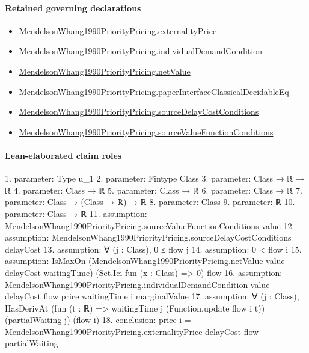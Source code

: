 \documentclass[10pt]{article}
\begin{document}
\paragraph{Retained governing declarations}
\begin{itemize}\raggedright
\item \hyperlink{governing-declaration-806f5a55d6021334}{Mendelson\allowbreak{}Whang1990\allowbreak{}Priority\allowbreak{}Pricing.\allowbreak{}externality\allowbreak{}Price}
\item \hyperlink{paper-prerequisite-6c93de2469b53cb2}{Mendelson\allowbreak{}Whang1990\allowbreak{}Priority\allowbreak{}Pricing.\allowbreak{}individual\allowbreak{}Demand\allowbreak{}Condition}
\item \hyperlink{paper-prerequisite-7dbaca4145f3a4a5}{Mendelson\allowbreak{}Whang1990\allowbreak{}Priority\allowbreak{}Pricing.\allowbreak{}net\allowbreak{}Value}
\item \hyperlink{governing-declaration-3df5d95507228c45}{Mendelson\allowbreak{}Whang1990\allowbreak{}Priority\allowbreak{}Pricing.\allowbreak{}paper\allowbreak{}Interface\allowbreak{}Classical\allowbreak{}Decidable\allowbreak{}Eq}
\item \hyperlink{paper-prerequisite-33c9dc55ddc7d5b6}{Mendelson\allowbreak{}Whang1990\allowbreak{}Priority\allowbreak{}Pricing.\allowbreak{}source\allowbreak{}Delay\allowbreak{}Cost\allowbreak{}Conditions}
\item \hyperlink{paper-prerequisite-9c435671d506207c}{Mendelson\allowbreak{}Whang1990\allowbreak{}Priority\allowbreak{}Pricing.\allowbreak{}source\allowbreak{}Value\allowbreak{}Function\allowbreak{}Conditions}
\end{itemize}
\paragraph{Lean-elaborated claim roles}\begin{ReviewVerbatim}
1. parameter: Type u_1
2. parameter: Fintype Class
3. parameter: Class → ℝ → ℝ
4. parameter: Class → ℝ
5. parameter: Class → ℝ
6. parameter: Class → ℝ
7. parameter: Class → (Class → ℝ) → ℝ
8. parameter: Class
9. parameter: ℝ
10. parameter: Class → ℝ
11. assumption: MendelsonWhang1990PriorityPricing.sourceValueFunctionConditions value
12. assumption: MendelsonWhang1990PriorityPricing.sourceDelayCostConditions delayCost
13. assumption: ∀ (j : Class), 0 ≤ flow j
14. assumption: 0 < flow i
15. assumption: IsMaxOn (MendelsonWhang1990PriorityPricing.netValue value delayCost waitingTime) (Set.Ici fun (x : Class) => 0) flow
16. assumption: MendelsonWhang1990PriorityPricing.individualDemandCondition value delayCost flow price waitingTime i marginalValue
17. assumption: ∀ (j : Class), HasDerivAt (fun (t : ℝ) => waitingTime j (Function.update flow i t)) (partialWaiting j) (flow i)
18. conclusion: price i = MendelsonWhang1990PriorityPricing.externalityPrice delayCost flow partialWaiting
\end{ReviewVerbatim}
\end{document}
